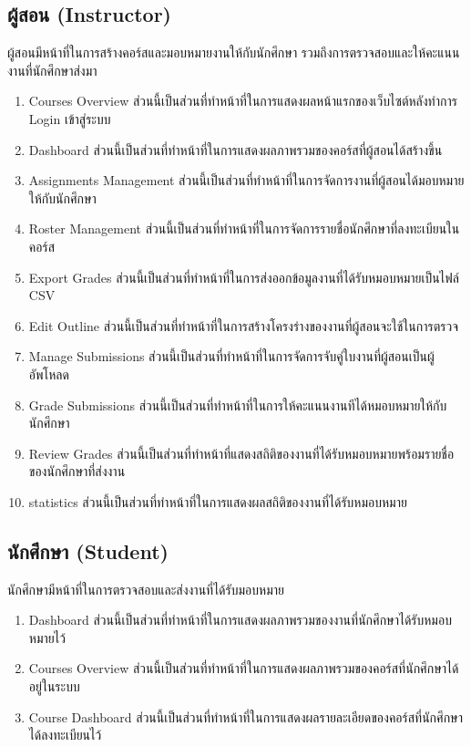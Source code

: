   \subsection{ผู้สอน (Instructor)}
    \par\hspace*{3em} ผู้สอนมีหน้าที่ในการสร้างคอร์สและมอบหมายงานให้กับนักศึกษา รวมถึงการตรวจสอบและให้คะแนนงานที่นักศึกษาส่งมา 
    \begin{enumerate}
        \item Courses Overview ส่วนนี้เป็นส่วนที่ทําหน้าที่ในการแสดงผลหน้าแรกของเว็บไซต์หลังทําการ Login เข้าสู่ระบบ
        \item Dashboard ส่วนนี้เป็นส่วนที่ทําหน้าที่ในการแสดงผลภาพรวมของคอร์สที่ผู้สอนได้สร้างขึ้น
        \item Assignments Management ส่วนนี้เป็นส่วนที่ทําหน้าที่ในการจัดการงานที่ผู้สอนได้มอบหมายให้กับนักศึกษา
        \item Roster Management ส่วนนี้เป็นส่วนที่ทําหน้าที่ในการจัดการรายชื่อนักศึกษาที่ลงทะเบียนในคอร์ส
        \item Export Grades ส่วนนี้เป็นส่วนที่ทําหน้าที่ในการส่งออกข้อมูลงานที่ได้รับหมอบหมายเป็นไฟล์ CSV 
        \item Edit Outline ส่วนนี้เป็นส่วนที่ทําหน้าที่ในการสร้างโครงร่างของงานที่ผู้สอนจะใช้ในการตรวจ
        \item Manage Submissions ส่วนนี้เป็นส่วนที่ทําหน้าที่ในการจัดการจับคู่ใบงานที่ผู้สอนเป็นผู้อัพโหลด
        \item Grade Submissions ส่วนนี้เป็นส่วนที่ทําหน้าที่ในการให้คะแนนงานทีได้หมอบหมายให้กับนักศึกษา
        \item Review Grades ส่วนนี้เป็นส่วนที่ทำหน้าที่แสดงสถิติของงานที่ได้รับหมอบหมายพร้อมรายชื่อของนักศึกษาที่ส่งงาน
        \item statistics ส่วนนี้เป็นส่วนที่ทําหน้าที่ในการแสดงผลสถิติของงานที่ได้รับหมอบหมาย 
    \end{enumerate}
  \subsection{นักศึกษา (Student)}
    \par\hspace*{3em} นักศึกษามีหน้าที่ในการตรวจสอบและส่งงานที่ได้รับมอบหมาย
    \begin{enumerate}
        \item Dashboard ส่วนนี้เป็นส่วนที่ทําหน้าที่ในการแสดงผลภาพรวมของงานที่นักศึกษาได้รับหมอบหมายไว้
        \item Courses Overview ส่วนนี้เป็นส่วนที่ทําหน้าที่ในการแสดงผลภาพรวมของคอร์สที่นักศึกษาได้อยู่ในระบบ
        \item Course Dashboard ส่วนนี้เป็นส่วนที่ทําหน้าที่ในการแสดงผลรายละเอียดของคอร์สที่นักศึกษาได้ลงทะเบียนไว้
    \end{enumerate}
